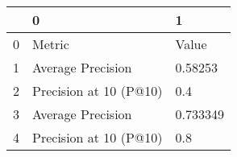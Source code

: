 \begin{tabular}{lll}
\toprule
{} &                       0 &         1 \\
\midrule
0 &                  Metric &     Value \\
1 &       Average Precision &   0.58253 \\
2 &  Precision at 10 (P@10) &       0.4 \\
3 &       Average Precision &  0.733349 \\
4 &  Precision at 10 (P@10) &       0.8 \\
\bottomrule
\end{tabular}
